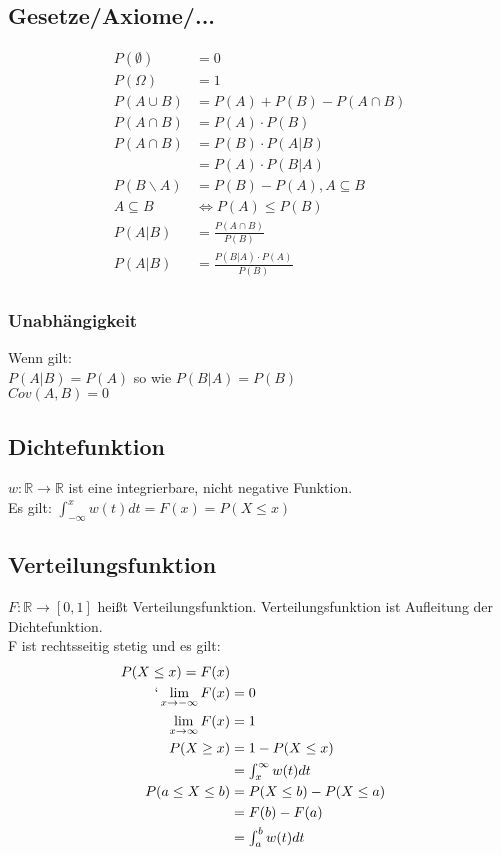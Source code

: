 \documentclass[a4paper, 8pt, landscape]{extarticle}
\newcommand{\limFromTo}[2]{ \lim\limits_{#2 \rightarrow #1}}
\let\oldint\int
\renewcommand{\int}{\ensuremath{\textstyle\oldint}}
\begin{document}
\begin{multicols*}{5}
	    \subsection{Gesetze/Axiome/...}
		    \begin{align*}
		    	P(\emptyset) &= 0\\
		    	P(\Omega) &= 1\\
		    	P(A \cup B) &= P(A) + P(B)-P(A \cap B)\\
		    	P(A \cap B) &= P(A) \cdot P(B)\\
		    	P(A\cap B) &= P(B) \cdot P(A|B)\\
		    	&= P(A) \cdot P(B|A)\\
		    	P(B \backslash A) &= P(B) - P(A), A \subseteq B\\
		    	A \subseteq B &\iff P(A) \leq P(B)\\
		    	P(A|B) &= \frac{P(A \cap B)}{P(B)} \\
		    	P(A|B) &= \frac{P(B|A)\cdot P(A)}{P(B)} \\
	    	\end{align*}
	    	\subsubsection{Unabhängigkeit}
	    		Wenn gilt:\\
	    		$P(A|B)=P(A)$ so wie $P(B|A)=P(B)$\\
	    		$Cov(A,B)=0$

		\subsection{Dichtefunktion}
		    $w: \mathbb{R} \rightarrow \mathbb{R}$ ist eine integrierbare, nicht negative Funktion. \\
	    	Es gilt: $\int_{-\infty}^{x} w(t) dt = F(x) = P(X \leq x)$
	    \subsection{Verteilungsfunktion}
	    	$F: \mathbb{R} \rightarrow \left[0,1\right]$ heißt Verteilungsfunktion. Verteilungsfunktion ist Aufleitung der Dichtefunktion.\\
	    	F ist rechtsseitig stetig und es gilt:
	    	\begin{align*}
	    		P(X\leq x) = F(x)\\`
	    		\limFromTo{-\infty}{x} F(x) &= 0\\
	    		\limFromTo{\infty}{x} F(x) &= 1\\
	    		P(X \geq x) &= 1 - P(X \leq x) \\
	    		&= \int_{x}^{\infty} w(t)dt\\
	    		P(a \le X \le b) &= P(X \le b) - P(X \le a)\\
	    		&= F(b) - F(a) \\
	    		&= \int_{a}^{b} w(t)dt
	    	\end{align*}

\end{multicols*}
\end{document}
